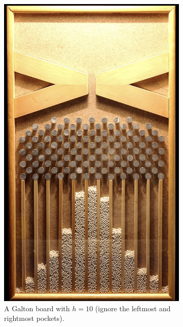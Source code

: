 \begin{tcolorbox}
    \begin{figure}[H]
        \centering
        \begin{subfigure}[l]{0.3\textwidth}
            \centering
            \includegraphics[width=\textwidth]{assets/images/q2d1.png}
            \caption{A Galton board with $h = 10$ (ignore the leftmost and
            rightmost pockets).}
            \label{fig_q2d1}
        \end{subfigure}
        \begin{subfigure}[r]{0.4\textwidth}
            \centering

\end{subfigure}
\end{figure}
\end{tcolorbox}
